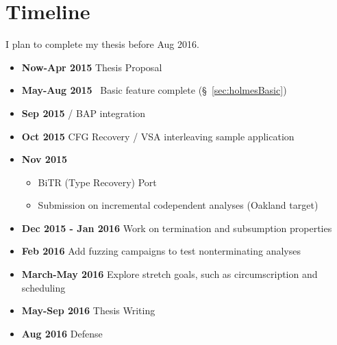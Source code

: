 \section{Timeline}
I plan to complete my thesis before Aug 2016.
\begin{itemize}[label={}]
\item {\bf Now-Apr 2015} Thesis Proposal
\item {\bf May-Aug 2015} \sysname\ Basic feature complete (\S~\ref{sec:holmesBasic})
\item {\bf Sep 2015} \sysname / BAP integration
\item {\bf Oct 2015} CFG Recovery / VSA interleaving sample application
\item {\bf Nov 2015}
  \begin{itemize}
  \item BiTR (Type Recovery) Port
  \item Submission on incremental codependent analyses (Oakland target)
  \end{itemize}
\item {\bf Dec 2015 - Jan 2016} Work on termination and subsumption properties
\item {\bf Feb 2016} Add fuzzing campaigns to test nonterminating analyses
\item {\bf March-May 2016} Explore stretch goals, such as circumscription and scheduling 
\item {\bf May-Sep 2016} Thesis Writing
\item {\bf Aug 2016} Defense
\end{itemize}
